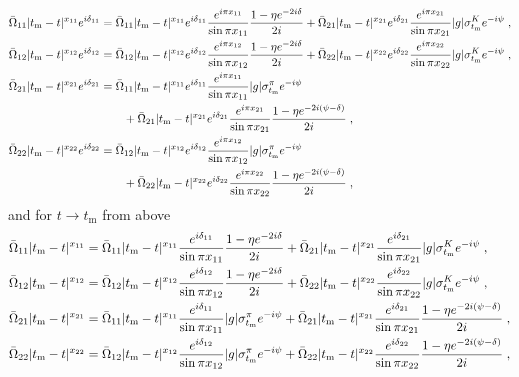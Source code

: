 \documentclass[11pt]{article}%
\providecommand{\ec}{\;,}
\providecommand{\nt}{\notag}
\newcommand{\tm}{t_\text{m}}
\begin{document}
{\allowdisplaybreaks
\begin{align}
\label{Omegaij_above}
 \bar\Omega_{11}|\tm-t|^{x_{11}}e^{i\delta_{11}}&=\bar\Omega_{11}|\tm-t|^{x_{11}}e^{i\delta_{11}}\frac{e^{i\pi x_{11}}}{\sin\pi x_{11}}\frac{1-\eta e^{-2i\delta}}{2i}+\bar\Omega_{21}|\tm-t|^{x_{21}}e^{i\delta_{21}}\frac{e^{i\pi x_{21}}}{\sin\pi x_{21}}|g|\sigma_{\tm}^Ke^{-i\psi}\ec\nt\\
 \bar\Omega_{12}|\tm-t|^{x_{12}}e^{i\delta_{12}}&=\bar\Omega_{12}|\tm-t|^{x_{12}}e^{i\delta_{12}}\frac{e^{i\pi x_{12}}}{\sin\pi x_{12}}\frac{1-\eta e^{-2i\delta}}{2i}+\bar\Omega_{22}|\tm-t|^{x_{22}}e^{i\delta_{22}}\frac{e^{i\pi x_{22}}}{\sin\pi x_{22}}|g|\sigma_{\tm}^Ke^{-i\psi}\ec\nt\\
%
\bar\Omega_{21}|\tm-t|^{x_{21}}e^{i\delta_{21}}&=\bar\Omega_{11}|\tm-t|^{x_{11}}e^{i\delta_{11}}\frac{e^{i\pi x_{11}}}{\sin\pi x_{11}}|g|\sigma_{\tm}^\pi e^{-i\psi}\nt\\
&\qquad+\bar\Omega_{21}|\tm-t|^{x_{21}}e^{i\delta_{21}}\frac{e^{i\pi x_{21}}}{\sin\pi x_{21}}\frac{1-\eta e^{-2i(\psi-\delta)}}{2i}\ec\nt\\
\bar\Omega_{22}|\tm-t|^{x_{22}}e^{i\delta_{22}}&=\bar\Omega_{12}|\tm-t|^{x_{12}}e^{i\delta_{12}}\frac{e^{i\pi x_{12}}}{\sin\pi x_{12}}|g|\sigma_{\tm}^\pi e^{-i\psi}\nt\\
&\qquad+\bar\Omega_{22}|\tm-t|^{x_{22}}e^{i\delta_{22}}\frac{e^{i\pi x_{22}}}{\sin\pi x_{22}}\frac{1-\eta e^{-2i(\psi-\delta)}}{2i}\ec
\end{align}
and for $t\to\tm$ from above
\begin{align}
\label{Omegaij_below}
 \bar\Omega_{11}|\tm-t|^{x_{11}}&=\bar\Omega_{11}|\tm-t|^{x_{11}}\frac{e^{i\delta_{11}}}{\sin\pi x_{11}}\frac{1-\eta e^{-2i\delta}}{2i}+\bar\Omega_{21}|\tm-t|^{x_{21}}\frac{e^{i\delta_{21}}}{\sin\pi x_{21}}|g|\sigma_{\tm}^K e^{-i\psi}\ec\nt\\
 \bar\Omega_{12}|\tm-t|^{x_{12}}&=\bar\Omega_{12}|\tm-t|^{x_{12}}\frac{e^{i\delta_{12}}}{\sin\pi x_{12}}\frac{1-\eta e^{-2i\delta}}{2i}+\bar\Omega_{22}|\tm-t|^{x_{22}}\frac{e^{i\delta_{22}}}{\sin\pi x_{22}}|g|\sigma_{\tm}^K e^{-i\psi}\ec\nt\\
%
\bar\Omega_{21}|\tm-t|^{x_{21}}&=\bar\Omega_{11}|\tm-t|^{x_{11}}\frac{e^{i\delta_{11}}}{\sin\pi x_{11}}|g|\sigma_{\tm}^\pi e^{-i\psi}
+\bar\Omega_{21}|\tm-t|^{x_{21}}\frac{e^{i\delta_{21}}}{\sin\pi x_{21}}\frac{1-\eta e^{-2i(\psi-\delta)}}{2i}\ec\nt\\
\bar\Omega_{22}|\tm-t|^{x_{22}}&=\bar\Omega_{12}|\tm-t|^{x_{12}}\frac{e^{i\delta_{12}}}{\sin\pi x_{12}}|g|\sigma_{\tm}^\pi e^{-i\psi}
+\bar\Omega_{22}|\tm-t|^{x_{22}}\frac{e^{i\delta_{22}}}{\sin\pi x_{22}}\frac{1-\eta e^{-2i(\psi-\delta)}}{2i}\ec
\end{align}
}\noindent
\end{document}

